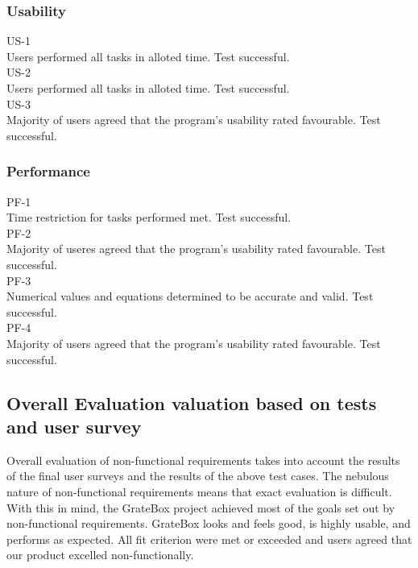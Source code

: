 \documentclass[12pt, titlepage]{article}
\begin{document}
\subsubsection{Usability}

US-1\\

Users performed all tasks in alloted time. Test successful.\\

US-2\\

Users performed all tasks in alloted time. Test successful.\\

US-3\\

Majority of users agreed that the program's usability rated favourable. Test successful.

\subsubsection{Performance}

PF-1\\

Time restriction for tasks performed met. Test successful.\\

PF-2\\

Majority of useres agreed that the program's usability rated favourable. Test successful.\\

PF-3\\

Numerical values and equations determined to be accurate and valid. Test successful.\\

PF-4\\

Majority of users agreed that the program's usability rated favourable. Test successful.

\subsection{Overall Evaluation valuation based on tests and user survey}

Overall evaluation of non-functional requirements takes into account the results of the final user surveys and the results of the above test cases. The nebulous nature of non-functional requirements means that exact evaluation is difficult. With this in mind, the GrateBox project achieved most of the goals set out by non-functional requirements. GrateBox looks and feels good, is highly usable, and performs as expected. All fit criterion were met or exceeded and users agreed that our product excelled non-functionally.
\end{document}
